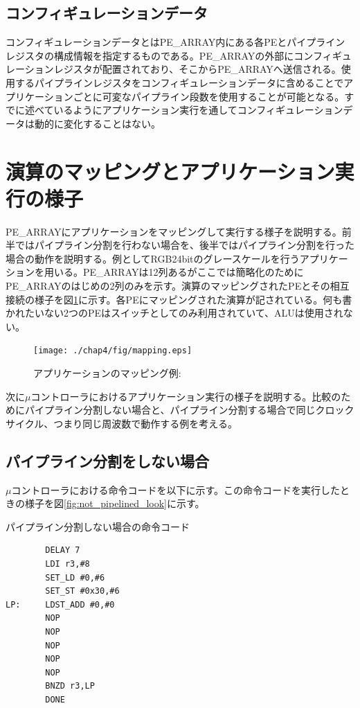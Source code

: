 {\subsection{コンフィギュレーションデータ}
\label{subsec:config_data}

コンフィギュレーションデータとはPE\_ARRAY内にある各PEとパイプラインレジスタの構成情報を指定するものである。PE\_ARRAYの外部にコンフィギュレーションレジスタが配置されており、そこからPE\_ARRAYへ送信される。使用するパイプラインレジスタをコンフィギュレーションデータに含めることでアプリケーションごとに可変なパイプライン段数を使用することが可能となる。すでに述べているようにアプリケーション実行を通してコンフィギュレーションデータは動的に変化することはない。

\section{演算のマッピングとアプリケーション実行の様子}
\label{sec:mapping}
PE\_ARRAYにアプリケーションをマッピングして実行する様子を説明する。前半ではパイプライン分割を行わない場合を、後半ではパイプライン分割を行った場合の動作を説明する。例としてRGB24bitのグレースケールを行うアプリケーションを用いる。PE\_ARRAYは12列あるがここでは簡略化のためにPE\_ARRAYのはじめの2列のみを示す。演算のマッピングされたPEとその相互接続の様子を図\ref{fig:mapping}に示す。各PEにマッピングされた演算が記されている。何も書かれたいない2つのPEはスイッチとしてのみ利用されていて、ALUは使用されない。

\begin{figure}[p]
\centering
\texttt{[image: ./chap4/fig/mapping.eps]}
\caption{アプリケーションのマッピング例:}
\label{fig:mapping}
\end{figure}

次に$\mu$コントローラにおけるアプリケーション実行の様子を説明する。比較のためにパイプライン分割しない場合と、パイプライン分割する場合で同じクロックサイクル、つまり同じ周波数で動作する例を考える。

\subsection{パイプライン分割をしない場合}
\label{subsec:not_pipeline}
$\mu$コントローラにおける命令コードを以下に示す。この命令コードを実行したときの様子を図\ref{fig:not_pipelined_look}に示す。
\begin{itembox}[l]{パイプライン分割しない場合の命令コード}
\begin{verbatim}
        DELAY 7
        LDI r3,#8
        SET_LD #0,#6
        SET_ST #0x30,#6
LP:     LDST_ADD #0,#0
        NOP
        NOP
        NOP
        NOP
        NOP
        BNZD r3,LP
        DONE
\end{verbatim}
\end{itembox}

}
